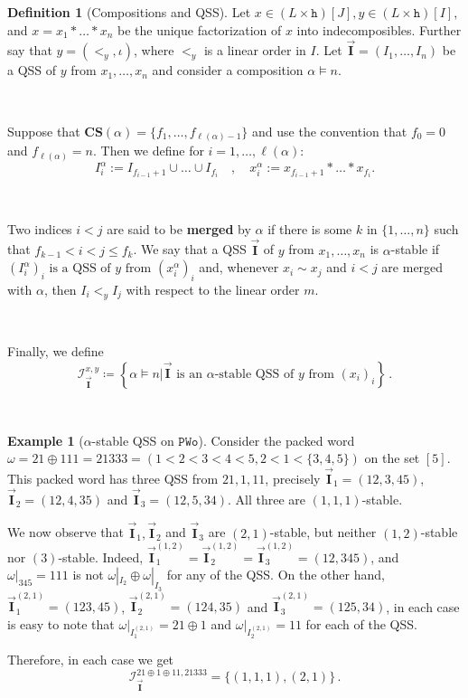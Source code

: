\documentclass[12pt, reqno]{amsart}
\theoremstyle{definition}
\newtheorem{defin}[thm]{Definition}
\newtheorem{smpl}[thm]{Example}
\newcommand{\III}{\vec{\mathbf{I}}}
\begin{document}
\begin{defin}[Compositions and QSS]
Let $x \in (L\times \mathtt{h})[J], y \in (L\times \mathtt{h})[I]$, and $x = x_1\ast \dots \ast x_n$ be the unique factorization of $x$ into indecomposibles.
Further say that $y = (<_y, \iota)$, where $<_y$ is a linear order in $I$.
Let $\III = (I_1, \dots , I_n)$ be a QSS of $y$ from $x_1, \dots, x_n$ and consider a composition $\alpha \models n$.

\

Suppose that $ \mathbf{CS} (\alpha) = \{f_1, \dots, f_{\ell(\alpha) - 1} \}$ and use the convention that $f_0 = 0$ and $f_{\ell(\alpha)} = n$. 
Then we define for $i = 1, \dots, \ell(\alpha)$:
\[I^{\alpha}_i := I_{f_{i-1} + 1} \cup \dots \cup I_{f_i} \quad , \quad x^{\alpha}_i := x_{f_{i-1} + 1} \ast \dots \ast x_{f_i}.\]

\

Two indices $i< j$ are said to be \textbf{merged} by $\alpha$ if there is some $k$ in $\{1, \dots, n\}$ such that $ f_{k-1} < i < j \leq f_k$.
We say that a QSS $\III$ of $y$ from $x_1, \dots , x_n$ is $\alpha $-stable if $(I^{\alpha}_i)_i \text{ is a QSS of $y$ from } (x^{\alpha}_i)_i$ and, whenever $x_i \sim x_j$ and $i < j$ are merged with $\alpha $, then $I_i <_y I_j$ with respect to the linear order $m$.

\

Finally, we define 
$$\mathcal I^{x, y}_{\III} \coloneqq \left\{ \alpha \models n \Big| \III \text{ is an $\alpha$-stable QSS of $y$ from } (x_i)_i \right\} \, .$$

\end{defin}

\

\begin{smpl}[$\alpha$-stable QSS on $\mathtt{PWo}$]
Consider the packed word $\omega = 21 \oplus 111 = 21333 = (1 < 2 < 3 < 4 < 5, 2 < 1 < \{3, 4, 5\})$ on the set $[5]$.
This packed word has three QSS from $21, 1, 11$, precisely $\III_1 =(12, 3, 45)$, $\III_2 =(12, 4, 35)$ and $\III_3 =(12, 5, 34)$.
All three are $(1, 1, 1)$-stable.

We now observe that $\III_1, \III_2$ and $\III_3$ are $(2, 1)$-stable, but neither $(1, 2)$-stable nor $(3)$-stable.
Indeed, $\III_1^{(1, 2)} = \III_2^{(1, 2)} = \III_3^{(1, 2)} = (12, 345)$, and $\omega|_{345} = 111$ is not $\omega|_{I_2} \oplus \omega|_{I_3}$ for any of the QSS.
On the other hand, $\III_1^{(2, 1)} = (123, 45)$, $\III_2^{(2, 1)} = (124, 35)$ and $\III_3^{(2, 1)} = (125, 34)$, in each case is easy to note that $\omega|_{I_1^{(2, 1)}} = 21\oplus 1$ and $\omega|_{I_2^{(2, 1)}} = 11$ for each of the QSS.

Therefore, in each case we get
$$\mathcal I_{\III}^{21\oplus 1\oplus 11, 21333} = \{(1, 1, 1), (2, 1)\}\, . $$
\end{smpl}
\end{document}
